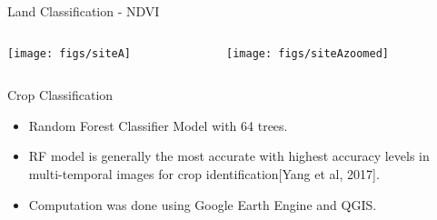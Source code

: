 \documentclass{beamer}
\begin{document}
\begin{frame}{Land Classification - NDVI}
	\begin{columns}
		\begin{column}{0.5\textwidth}
			\begin{center}
				\texttt{[image: figs/siteA]}
			\end{center}
		\end{column}
		\begin{column}{0.5\textwidth}
			\begin{center}
				\texttt{[image: figs/siteAzoomed]}
			\end{center}
		\end{column}
	\end{columns}
\end{frame}

\begin{frame}{Crop Classification}
	\begin{itemize}
		\item Random Forest Classifier Model with 64 trees.
		\item RF model is generally the most accurate with highest accuracy levels in multi-temporal images for crop identification[Yang et al, 2017].
		\item Computation was done using Google Earth Engine and QGIS. 
	\end{itemize}
	
\end{frame}
\end{document}
